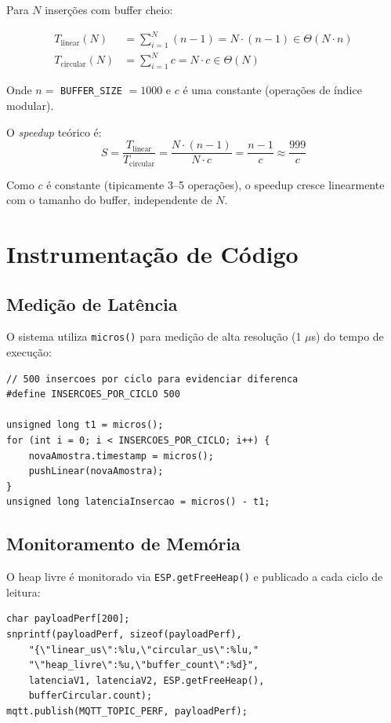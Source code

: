 \documentclass[12pt, a4paper]{article}
\begin{document}
Para $N$ inserções com buffer cheio:

\begin{align}
T_{\text{linear}}(N) &= \sum_{i=1}^{N} (n - 1) = N \cdot (n - 1) \in \Theta(N \cdot n) \\
T_{\text{circular}}(N) &= \sum_{i=1}^{N} c = N \cdot c \in \Theta(N)
\end{align}

Onde $n = $ \texttt{BUFFER\_SIZE} $= 1000$ e $c$ é uma constante (operações de índice modular).

O \textit{speedup} teórico é:
\[
S = \frac{T_{\text{linear}}}{T_{\text{circular}}} = \frac{N \cdot (n-1)}{N \cdot c} = \frac{n-1}{c} \approx \frac{999}{c}
\]

Como $c$ é constante (tipicamente 3--5 operações), o speedup cresce linearmente com o tamanho do buffer, independente de $N$.

\section{Instrumentação de Código}

\subsection{Medição de Latência}

O sistema utiliza \texttt{micros()} para medição de alta resolução (1 $\mu$s) do tempo de execução:

\begin{lstlisting}[caption={Instrumentação no loop principal}]
// 500 insercoes por ciclo para evidenciar diferenca
#define INSERCOES_POR_CICLO 500

unsigned long t1 = micros();
for (int i = 0; i < INSERCOES_POR_CICLO; i++) {
    novaAmostra.timestamp = micros();
    pushLinear(novaAmostra);
}
unsigned long latenciaInsercao = micros() - t1;
\end{lstlisting}

\subsection{Monitoramento de Memória}

O heap livre é monitorado via \texttt{ESP.getFreeHeap()} e publicado a cada ciclo de leitura:

\begin{lstlisting}[caption={Publicação de métricas de performance via MQTT}]
char payloadPerf[200];
snprintf(payloadPerf, sizeof(payloadPerf),
    "{\"linear_us\":%lu,\"circular_us\":%lu,"
    "\"heap_livre\":%u,\"buffer_count\":%d}",
    latenciaV1, latenciaV2, ESP.getFreeHeap(),
    bufferCircular.count);
mqtt.publish(MQTT_TOPIC_PERF, payloadPerf);
\end{lstlisting}
\end{document}
